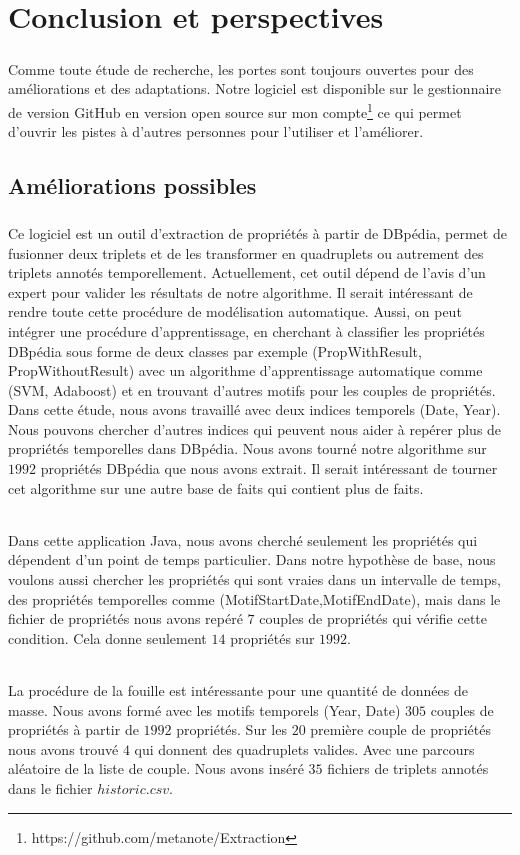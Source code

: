 \chapter{Conclusion et perspectives}
\paragraph{}
Comme toute étude de recherche, les portes sont toujours ouvertes pour des améliorations et des adaptations. Notre logiciel est disponible sur le gestionnaire de version GitHub en version open source sur mon compte\footnote{https://github.com/metanote/Extraction} ce qui permet d'ouvrir les pistes à d'autres personnes pour l'utiliser et l'améliorer. 
\section*{Améliorations possibles}
\paragraph{}
Ce logiciel est un outil d'extraction de propriétés à partir de DBpédia, permet de fusionner deux triplets et de les transformer en quadruplets ou autrement des triplets annotés temporellement. Actuellement, cet outil dépend de l'avis d'un expert pour valider les résultats de notre algorithme. Il serait intéressant de rendre toute cette procédure de modélisation automatique. Aussi, on peut intégrer une procédure d'apprentissage, en cherchant à classifier les propriétés DBpédia sous forme de deux classes par exemple (PropWithResult, PropWithoutResult) avec un algorithme d'apprentissage automatique comme (SVM, Adaboost) et en trouvant d'autres motifs pour les couples de propriétés. Dans cette étude, nous avons travaillé avec deux indices temporels (Date, Year). Nous pouvons chercher d'autres indices qui peuvent nous aider à repérer plus de propriétés temporelles dans DBpédia. Nous avons tourné notre algorithme sur $1992$ propriétés DBpédia que nous avons extrait. Il serait intéressant de tourner cet algorithme sur une autre base de faits qui contient plus de faits.
\subparagraph{}
Dans cette application Java, nous avons cherché seulement les propriétés qui dépendent d'un point de temps particulier.
Dans notre hypothèse de base, nous voulons aussi chercher les propriétés qui sont vraies dans un intervalle de temps, des propriétés temporelles comme (MotifStartDate,MotifEndDate), mais dans le fichier de propriétés nous avons repéré $7$ couples de propriétés qui vérifie cette condition. Cela donne seulement $14$ propriétés sur $1992$.
\subparagraph{}
La procédure de la fouille est intéressante pour une quantité de données de masse. Nous avons formé avec les motifs temporels (Year, Date) $305$ couples de propriétés à partir de $1992$ propriétés. Sur les $20$ première couple de propriétés nous avons trouvé $4$ qui donnent des quadruplets valides. Avec une parcours aléatoire de la liste de couple. Nous avons inséré $35$ fichiers de triplets annotés dans le fichier $historic.csv$.
